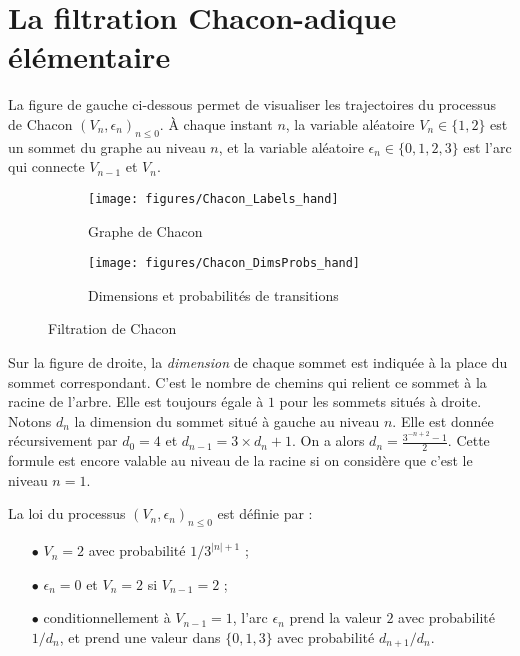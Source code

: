 \documentclass[12pt,a4paper]{article}
\begin{document}
\section{La filtration Chacon-adique élémentaire}

La figure de gauche ci-dessous permet de visualiser 
les trajectoires du processus de Chacon 
${(V_n, \epsilon_n)}_{n \leq 0}$.   
À chaque instant $n$, la variable aléatoire $V_n \in \{1,2\}$ est un sommet 
du graphe au niveau $n$, et la variable aléatoire $\epsilon_n \in \{0, 1, 2, 3\}$ 
est l'arc qui connecte $V_{n-1}$ et $V_n$. 

\begin{figure}[!h]
   \centering
   \begin{subfigure}[t]{0.47\textwidth}
   \centering
   	\texttt{[image: figures/Chacon\_Labels\_hand]}
 		\caption{\footnotesize Graphe de Chacon}\label{fig:ChaconLabels}
    \end{subfigure}              
   \quad
    \begin{subfigure}[t]{0.47\textwidth}
    \centering
   	\texttt{[image: figures/Chacon\_DimsProbs\_hand]}
 		\caption{\footnotesize Dimensions et probabilités de transitions}\label{fig:ChaconDimsProbs}
 	\end{subfigure}      

   \caption{Filtration de Chacon}\label{fig:ChaconGraph}
   \label{fig:ostro}
 \end{figure}

Sur la figure de droite, la \emph{dimension} de chaque sommet est indiquée à la place 
du sommet correspondant. C'est le nombre de chemins qui relient ce sommet à la racine 
de l'arbre. Elle est toujours égale à $1$ pour les sommets situés à droite. 
Notons $d_n$ la dimension du sommet situé à gauche au niveau $n$. 
Elle est donnée récursivement par $d_0=4$ et $d_{n-1} = 3 \times d_n+1$. 
On a alors $d_n=\frac{3^{-n+2}-1}{2}$. Cette formule est encore 
valable au niveau de la racine si on considère que c'est le niveau $n=1$. 

La loi du processus ${(V_n, \epsilon_n)}_{n \leq 0}$ est définie par :

\begin{itemize}
\item[$\bullet$] $V_n = 2$ avec probabilité $1/3^{|n|+1}$ ;

\item[$\bullet$] $\epsilon_n=0$ et $V_n=2$ si $V_{n-1}=2$ ;

\item[$\bullet$] conditionnellement à $V_{n-1}=1$, l'arc $\epsilon_n$ prend la 
valeur $2$ avec probabilité $1/d_{n}$, et prend une valeur dans 
$\{0,1,3\}$ avec probabilité $d_{n+1}/d_n$. 
\end{itemize}
\end{document}

